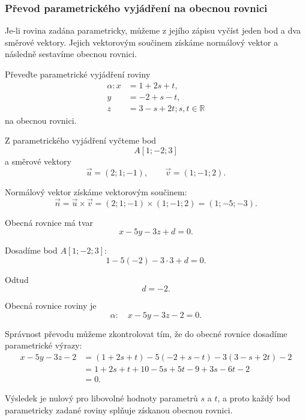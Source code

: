 \subsubsection{Převod parametrického vyjádření na obecnou rovnici}
\label{subsubsec:Parametric_to_general_plane}

Je-li rovina zadána parametricky, můžeme z jejího zápisu vyčíst jeden
bod a dva směrové vektory. Jejich vektorovým součinem získáme normálový
vektor a následně sestavíme obecnou rovnici.

\begin{example}
    \label{exa:Parametric_to_general_plane}

    Převeďte parametrické vyjádření roviny
    \[
        \begin{aligned}
            \alpha: x&=1+2s+t,\\
            y&=-2+s-t,\\
            z&=3-s+2t; s,t\in\mathbb{R}
        \end{aligned}
    \]
    na obecnou rovnici.

    Z parametrického vyjádření vyčteme bod
    \[
        A[1;-2;3]
    \]
    a směrové vektory
    \[
        \vec{u}=(2;1;-1),
        \qquad
        \vec{v}=(1;-1;2).
    \]

    Normálový vektor získáme vektorovým součinem:
    \[
        \vec{n}
        =
        \vec{u}\times\vec{v}
        =
        (2;1;-1)\times(1;-1;2)
        =
        (1;-5;-3).
    \]

    Obecná rovnice má tvar
    \[
        x-5y-3z+d=0.
    \]

    Dosadíme bod $A[1;-2;3]$:
    \[
        1-5(-2)-3\cdot3+d=0.
    \]

    Odtud
    \[
        d=-2.
    \]

    Obecná rovnice roviny je
    \[
        \alpha:\quad x-5y-3z-2=0.
    \]
\end{example}

Správnost převodu můžeme zkontrolovat tím, že do obecné rovnice
dosadíme parametrické výrazy:
\begin{align*}
    x-5y-3z-2
    &=
    (1+2s+t)-5(-2+s-t)-3(3-s+2t)-2\\
    &=
    1+2s+t+10-5s+5t-9+3s-6t-2\\
    &=
    0.
\end{align*}

Výsledek je nulový pro libovolné hodnoty parametrů $s$ a $t$, a proto
každý bod parametricky zadané roviny splňuje získanou obecnou rovnici.


